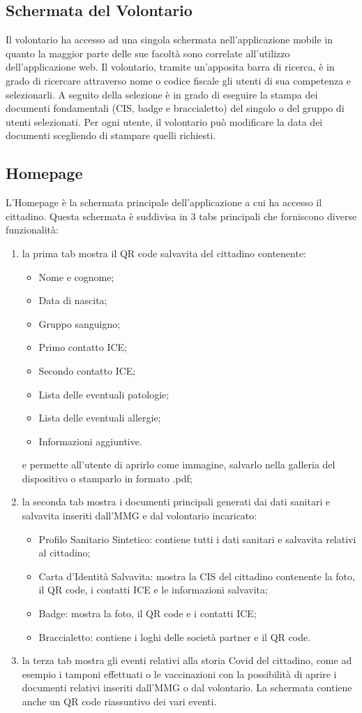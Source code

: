 \documentclass[12pt,a4paper,twoside,openright,titlepage]{book}
\begin{document}
\subsection{Schermata del Volontario}
Il volontario ha accesso ad una singola schermata nell'applicazione mobile in quanto la maggior parte delle sue facoltà sono correlate all'utilizzo dell'applicazione web. Il volontario, tramite un'apposita barra di ricerca, è in grado di ricercare attraverso nome o codice fiscale gli utenti di sua competenza e selezionarli. A seguito della selezione è in grado di eseguire la stampa dei documenti fondamentali (CIS, badge e braccialetto) del singolo o del gruppo di utenti selezionati. Per ogni utente, il volontario può modificare la data dei documenti scegliendo di stampare quelli richiesti.

\subsection{Homepage}
L'Homepage è la schermata principale dell'applicazione a cui ha accesso il cittadino. Questa schermata è suddivisa in 3 tabs principali che forniscono diverse funzionalità:
\begin{enumerate}
\item la prima tab mostra il QR code salvavita del cittadino contenente:
\begin{itemize}
\item Nome e cognome;
\item Data di nascita;
\item Gruppo sanguigno;
\item Primo contatto ICE;
\item Secondo contatto ICE;
\item Lista delle eventuali patologie;
\item Lista delle eventuali allergie;
\item Informazioni aggiuntive.
\end{itemize}
e permette all'utente di aprirlo come immagine, salvarlo nella galleria del dispositivo o stamparlo in formato .pdf;
\item la seconda tab mostra i documenti principali generati dai dati sanitari e salvavita inseriti dall'MMG e dal volontario incaricato:
\begin{itemize}
\item Profilo Sanitario Sintetico: contiene tutti i dati sanitari e salvavita relativi al cittadino;
\item Carta d'Identità Salvavita: mostra la CIS del cittadino contenente la foto, il QR code, i contatti ICE e le informazioni salvavita;
\item Badge: mostra la foto, il QR code e i contatti ICE;
\item Braccialetto: contiene i loghi delle società partner e il QR code.
\end{itemize}
\item la terza tab mostra gli eventi relativi alla storia Covid del cittadino, come ad esempio i tamponi effettuati o le vaccinazioni con la possibilità di aprire i documenti relativi inseriti dall'MMG o dal volontario. La schermata contiene anche un QR code riassuntivo dei vari eventi.
\end{enumerate}
\end{document}
